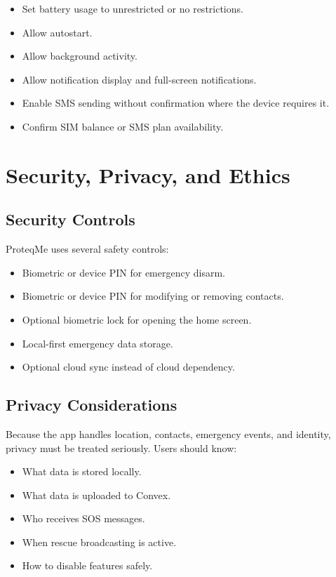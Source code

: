 \documentclass[12pt,a4paper]{report}
\newcommand{\projectname}{ProteqMe}
\begin{document}
\begin{itemize}
    \item Set battery usage to unrestricted or no restrictions.
    \item Allow autostart.
    \item Allow background activity.
    \item Allow notification display and full-screen notifications.
    \item Enable SMS sending without confirmation where the device requires it.
    \item Confirm SIM balance or SMS plan availability.
\end{itemize}

\chapter{Security, Privacy, and Ethics}

\section{Security Controls}

\projectname{} uses several safety controls:

\begin{itemize}
    \item Biometric or device PIN for emergency disarm.
    \item Biometric or device PIN for modifying or removing contacts.
    \item Optional biometric lock for opening the home screen.
    \item Local-first emergency data storage.
    \item Optional cloud sync instead of cloud dependency.
\end{itemize}

\section{Privacy Considerations}

Because the app handles location, contacts, emergency events, and identity, privacy must be treated seriously. Users should know:

\begin{itemize}
    \item What data is stored locally.
    \item What data is uploaded to Convex.
    \item Who receives SOS messages.
    \item When rescue broadcasting is active.
    \item How to disable features safely.
\end{itemize}
\end{document}
